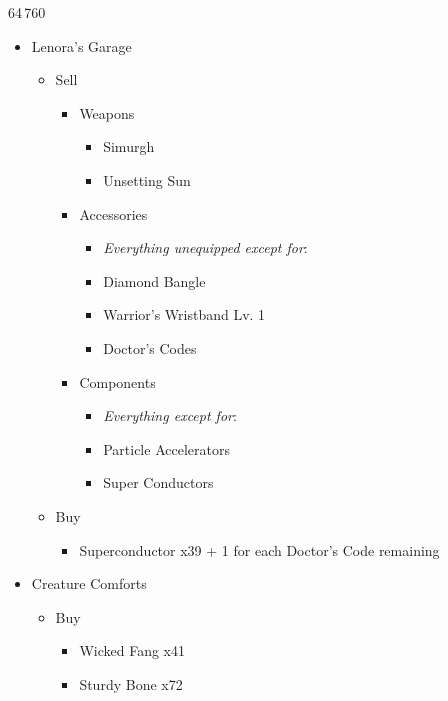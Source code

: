 \begin{multicols}{2}
\begin{shop}{64\,760}
\begin{itemize}
    \item Lenora's Garage
    \begin{itemize}
        \item Sell
        \begin{itemize}
            \item Weapons
            \begin{itemize}
                \item Simurgh
                \item Unsetting Sun
            \end{itemize}
            \item Accessories
            \begin{itemize}
                \item \textit{Everything unequipped except for}:
                \item Diamond Bangle
                \item Warrior's Wristband Lv. 1
                \item Doctor's Codes
            \end{itemize}
            \item Components
            \begin{itemize}
                \item \textit{Everything except for}:
                \item Particle Accelerators
                \item Super Conductors
            \end{itemize}
        \end{itemize}
        \item Buy
        \begin{itemize}
            \item Superconductor x39 + 1 for each Doctor's Code remaining
        \end{itemize}
    \end{itemize}
    \item Creature Comforts
    \begin{itemize}
        \item Buy
        \begin{itemize}
            \item Wicked Fang x41
            \item Sturdy Bone x72

\end{itemize}
\end{itemize}
\end{itemize}
\end{shop}
\end{multicols}

